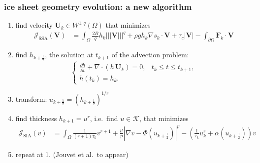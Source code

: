 \documentclass{beamer}
\newcommand{\Div}{\nabla\cdot}
\newcommand{\grad}{\nabla}
\newcommand{\Tnorm}[1]{\left|\!\left|\!\left|#1\right|\!\right|\!\right|}
\newcommand{\Wq}{W^{1,q}(\Omega)}
\begin{document}
\begin{frame}
  \frametitle{ice sheet geometry evolution: a new algorithm}

\begin{enumerate}
\small
\item find velocity $\mathbf{U}_k \in \Wq$ that minimizes
\begin{align*}
\mathcal{J}_{\text{SSA}}(\mathbf{V}) &= \int_\Omega \frac{2 B}{q} h_k \Tnorm{\mathbf{V}}^q + \rho g h_k \grad s_k \cdot \mathbf{V} + \tau_c |\mathbf{V}| - \int_{\partial\Omega} \mathbf{F}_k \cdot \mathbf{V}
\end{align*}
\item find $h_{k+\frac12}$, the solution at $t_{k+1}$ of the advection problem:
$$\begin{cases}
  \frac{\partial h}{\partial t} + \Div \left(h\, \mathbf{U}_k\right) = 0, & t_k \le t \le t_{k+1}, \\
  h(t_k) = h_k. &
\end{cases}$$
\item transform: $u_{k+\frac12} = (h_{k+\frac12})^{1/r}$
\item find thickness $h_{k+1} = u^r$, i.e.~find $u\in\mathcal{K}$, that minimizes
\begin{align*}
\mathcal{J}_{\text{SIA}}(v) &= \int_{\Omega} \frac{1}{(r+1)\tau_k} v^{r+1} + \frac{\mu}{p} |\nabla v - \Phi(u_{k+\frac12})|^p - \left(\frac{1}{\tau_k} u_k^r + \alpha(u_{k+\frac12})\right) v
\end{align*}
\item repeat at {\color{dark blue} 1.} \hfill \scriptsize (Jouvet et al.~to appear)
\end{enumerate}
\end{frame}
\end{document}
